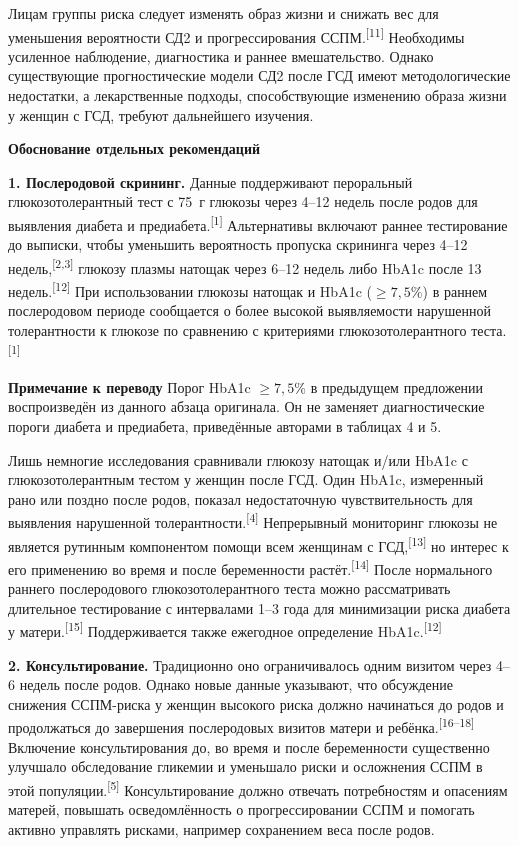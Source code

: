\documentclass[11pt,a4paper]{article}
\newcommand{\src}[1]{\textsuperscript{[#1]}}
\newcommand{\editorial}[1]{\par\begingroup\small\color{black!70}\textbf{Примечание к переводу} #1\par\endgroup}
\newcommand{\heading}[1]{\par\medskip\textbf{#1}\par}
\begin{document}
Лицам группы риска следует изменять образ жизни и снижать вес для уменьшения вероятности СД2 и прогрессирования ССПМ.\src{11} Необходимы усиленное наблюдение, диагностика и раннее вмешательство. Однако существующие прогностические модели СД2 после ГСД имеют методологические недостатки, а лекарственные подходы, способствующие изменению образа жизни у женщин с ГСД, требуют дальнейшего изучения.

\heading{Обоснование отдельных рекомендаций}
\textbf{1. Послеродовой скрининг.} Данные поддерживают пероральный глюкозотолерантный тест с 75~г глюкозы через 4--12 недель после родов для выявления диабета и предиабета.\src{1} Альтернативы включают раннее тестирование до выписки, чтобы уменьшить вероятность пропуска скрининга через 4--12 недель,\src{2,3} глюкозу плазмы натощак через 6--12 недель либо HbA1c после 13 недель.\src{12} При использовании глюкозы натощак и HbA1c ($\geq7{,}5\%$) в раннем послеродовом периоде сообщается о более высокой выявляемости нарушенной толерантности к глюкозе по сравнению с критериями глюкозотолерантного теста.\src{1}

\editorial{Порог HbA1c $\geq7{,}5\%$ в предыдущем предложении воспроизведён из данного абзаца оригинала. Он не заменяет диагностические пороги диабета и предиабета, приведённые авторами в таблицах 4 и 5.}

Лишь немногие исследования сравнивали глюкозу натощак и/или HbA1c с глюкозотолерантным тестом у женщин после ГСД. Один HbA1c, измеренный рано или поздно после родов, показал недостаточную чувствительность для выявления нарушенной толерантности.\src{4} Непрерывный мониторинг глюкозы не является рутинным компонентом помощи всем женщинам с ГСД,\src{13} но интерес к его применению во время и после беременности растёт.\src{14} После нормального раннего послеродового глюкозотолерантного теста можно рассматривать длительное тестирование с интервалами 1--3 года для минимизации риска диабета у матери.\src{15} Поддерживается также ежегодное определение HbA1c.\src{12}

\textbf{2. Консультирование.} Традиционно оно ограничивалось одним визитом через 4--6 недель после родов. Однако новые данные указывают, что обсуждение снижения ССПМ-риска у женщин высокого риска должно начинаться до родов и продолжаться до завершения послеродовых визитов матери и ребёнка.\src{16--18} Включение консультирования до, во время и после беременности существенно улучшало обследование гликемии и уменьшало риски и осложнения ССПМ в этой популяции.\src{5} Консультирование должно отвечать потребностям и опасениям матерей, повышать осведомлённость о прогрессировании ССПМ и помогать активно управлять рисками, например сохранением веса после родов.
\end{document}
